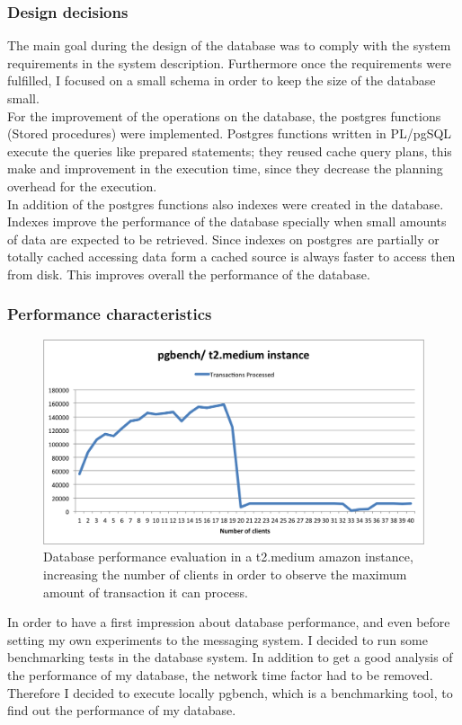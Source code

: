 \subsubsection{Design decisions}\label{sec:design-decisions}
The main goal during the design of the database was to comply with the system requirements in the system description. Furthermore once the requirements were fulfilled, I focused on a small schema in order to keep the size of the database small.\\
For the improvement of the operations on the database, the postgres functions (Stored procedures) were implemented.  Postgres functions written in PL/pgSQL execute the queries like prepared statements; they reused cache query plans, this make and improvement in the execution time, since they decrease the planning overhead for the execution.\cite{postsql}\\

In addition of the postgres functions also indexes were created in the database. Indexes improve the performance of the database specially when small amounts of data are expected to be retrieved. Since indexes on postgres are partially or totally cached accessing data form a cached source is always faster to access then from disk. This improves overall the performance of the database. 


\subsubsection{Performance characteristics}\label{sec:performance-characteristics}
\begin{figure}[h!]
	\centering
	\includegraphics[scale=0.5]{pgbench.png}
	\caption{Database performance evaluation in a t2.medium amazon instance, increasing the number of clients in order to observe the maximum amount of transaction it can process.}
	\label{pgbench}
\end{figure}
In order to have a first impression about database performance, and even before setting my own experiments to the messaging system. I decided to run some benchmarking tests in the database system.  In addition to get a good analysis of the performance of my database, the network time factor had to be removed. Therefore I decided to execute locally pgbench, which is a benchmarking tool, to find out the performance of my database.\\

